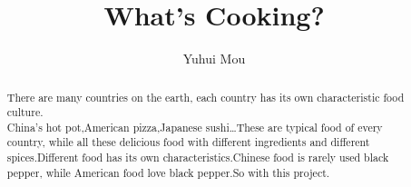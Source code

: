 \documentclass[sigconf]{acmart}
\begin{document}
%
%
\title{What's Cooking?}%


\author{Yuhui Mou}


\renewcommand{\shortauthors}{G. Li et al.}


\begin{abstract}
  There are many countries on the earth, each country has its own characteristic food culture. \\
  China's hot pot,American pizza,Japanese sushi\ldots These are typical food of every country,
  while all these delicious food with different ingredients and different spices.Different food 
  has its own characteristics.Chinese food is rarely used black pepper, 
  while American food love black pepper.So with this project.
\end{abstract}

\maketitle



% 
% 
\end{document}
